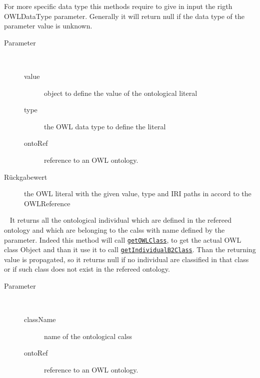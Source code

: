\begin{description}
 For more specific data type this methods require to give in input the 
 rigth OWLDataType parameter. Generally it will return null if the 
 data type of the parameter value is unknown.
\begin{description}
\item[Parameter] ~
\begin{description}
\item[value]
object to define the value of the ontological literal
\item[type]
the OWL data type to define the literal
\item[ontoRef]
reference to an OWL ontology.
\end{description}
\item[Rückgabewert] 
the OWL literal with the given value, type and IRI paths in accord to the OWLReference
\end{description}
\item[{\ltdHypertarget{ontologyFramework.OFContextManagement.OWLLibrary.getIndividualB2Class(java.lang.String,ontologyFramework.OFContextManagement.OWLReferences)}{getIndividualB2Class}\label{ontologyFramework.OFContextManagement.OWLLibrary.getIndividualB2Class(java.lang.String,ontologyFramework.OFContextManagement.OWLReferences)}}]
~ It returns all the ontological individual which are defined in the 
 refereed ontology and which are belonging to the calss with name 
 defined by the parameter. Indeed this method will call \texttt{\hyperlink{ontologyFramework.OFContextManagement.OWLLibrary.getOWLClass(java.lang.String,ontologyFramework.OFContextManagement.OWLReferences)}{getOWLClass}},
 to get the actual OWL class Object and than it use it to call
 \texttt{\hyperlink{ontologyFramework.OFContextManagement.OWLLibrary.getIndividualB2Class(org.semanticweb.owlapi.model.OWLClass,ontologyFramework.OFContextManagement.OWLReferences)}{getIndividualB2Class}}. Than the 
 returning value is propagated, so it returns null if no individual are
 classified in that class or if such class does not exist in 
 the refereed ontology.
\begin{description}
\item[Parameter] ~
\begin{description}
\item[className]
name of the ontological calss
\item[ontoRef]
reference to an OWL ontology.
\end{description}

\end{description}
\end{description}
